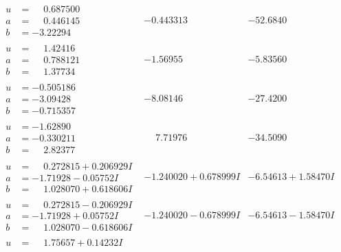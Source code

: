 \documentclass[1p]{elsarticle_modified}
\theoremstyle{definition}
\begin{document}
$$\begin{array}{c|c|c}
\begin{aligned}
u &= \phantom{-}0.687500\phantom{ +0.000000I} \\
a &= \phantom{-}0.446145\phantom{ +0.000000I} \\
b &= -3.22294\phantom{ +0.000000I}\end{aligned}
 & -0.443313\phantom{ +0.000000I} & -52.6840\phantom{ +0.000000I} \\ \hline\begin{aligned}
u &= \phantom{-}1.42416\phantom{ +0.000000I} \\
a &= \phantom{-}0.788121\phantom{ +0.000000I} \\
b &= \phantom{-}1.37734\phantom{ +0.000000I}\end{aligned}
 & -1.56955\phantom{ +0.000000I} & -5.83560\phantom{ +0.000000I} \\ \hline\begin{aligned}
u &= -0.505186\phantom{ +0.000000I} \\
a &= -3.09428\phantom{ +0.000000I} \\
b &= -0.715357\phantom{ +0.000000I}\end{aligned}
 & -8.08146\phantom{ +0.000000I} & -27.4200\phantom{ +0.000000I} \\ \hline\begin{aligned}
u &= -1.62890\phantom{ +0.000000I} \\
a &= -0.330211\phantom{ +0.000000I} \\
b &= \phantom{-}2.82377\phantom{ +0.000000I}\end{aligned}
 & \phantom{-}7.71976\phantom{ +0.000000I} & -34.5090\phantom{ +0.000000I} \\ \hline\begin{aligned}
u &= \phantom{-}0.272815 + 0.206929 I \\
a &= -1.71928 - 0.05752 I \\
b &= \phantom{-}1.028070 + 0.618606 I\end{aligned}
 & -1.240020 + 0.678999 I & -6.54613 + 1.58470 I \\ \hline\begin{aligned}
u &= \phantom{-}0.272815 - 0.206929 I \\
a &= -1.71928 + 0.05752 I \\
b &= \phantom{-}1.028070 - 0.618606 I\end{aligned}
 & -1.240020 - 0.678999 I & -6.54613 - 1.58470 I \\ \hline\begin{aligned}
u &= \phantom{-}1.75657 + 0.14232 I \\

\end{aligned}
\end{array}$$
\end{document}
